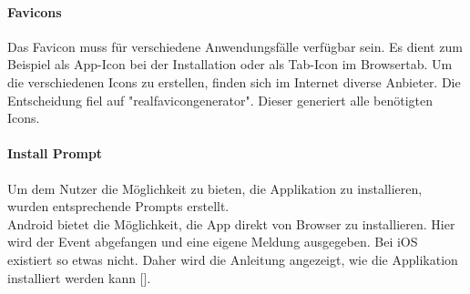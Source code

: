 \paragraph{Favicons}
Das Favicon muss für verschiedene Anwendungsfälle verfügbar sein. Es dient zum Beispiel als App-Icon bei der Installation oder als Tab-Icon im Browsertab. Um die verschiedenen Icons zu erstellen, finden sich im Internet diverse Anbieter. Die Entscheidung fiel auf "realfavicongenerator". Dieser generiert alle benötigten Icons. 

\paragraph{Install Prompt}
Um dem Nutzer die Möglichkeit zu bieten, die Applikation zu installieren, wurden entsprechende Prompts erstellt.\\
Android bietet die Möglichkeit, die App direkt von Browser zu installieren. Hier wird der Event abgefangen und eine eigene Meldung ausgegeben. Bei iOS existiert so etwas nicht. Daher wird die Anleitung angezeigt, wie die Applikation installiert werden kann [\cite{install}].
